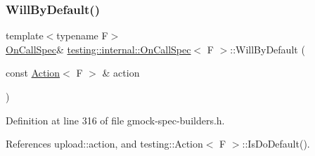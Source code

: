 \subsubsection{\texorpdfstring{Will\+By\+Default()}{WillByDefault()}}
{\footnotesize\ttfamily template$<$typename F$>$ \\
\hyperlink{classtesting_1_1internal_1_1OnCallSpec}{On\+Call\+Spec}\& \hyperlink{classtesting_1_1internal_1_1OnCallSpec}{testing\+::internal\+::\+On\+Call\+Spec}$<$ F $>$\+::Will\+By\+Default (\begin{DoxyParamCaption}\item[{const \hyperlink{classtesting_1_1Action}{Action}$<$ F $>$ \&}]{action }\end{DoxyParamCaption})\hspace{0.3cm}{\ttfamily [inline]}}



Definition at line 316 of file gmock-\/spec-\/builders.\+h.



References upload\+::action, and testing\+::\+Action$<$ F $>$\+::\+Is\+Do\+Default().


